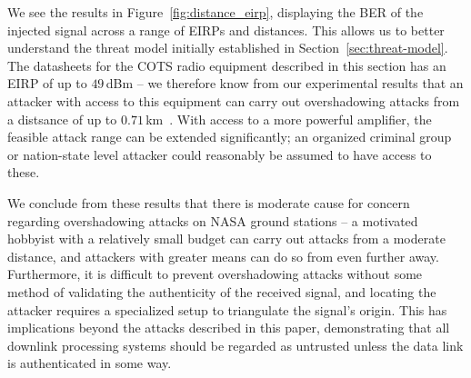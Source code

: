 We see the results in Figure~\ref{fig:distance_eirp}, displaying the BER of the injected signal across a range of EIRPs and distances.
This allows us to better understand the threat model initially established in Section~\ref{sec:threat-model}.
The datasheets for the COTS radio equipment described in this section has an EIRP of up to $49$\,dBm -- we therefore know from our experimental results that an attacker with access to this equipment can carry out overshadowing attacks from a distsance of up to $0.71$\,km~\cite{endurosat:xbandtransmitter,endurosat:xbandantenna}.
With access to a more powerful amplifier, the feasible attack range can be extended significantly; an organized criminal group or nation-state level attacker could reasonably be assumed to have access to these.

We conclude from these results that there is moderate cause for concern regarding overshadowing attacks on NASA ground stations -- a motivated hobbyist with a relatively small budget can carry out attacks from a moderate distance, and attackers with greater means can do so from even further away.
Furthermore, it is difficult to prevent overshadowing attacks without some method of validating the authenticity of the received signal, and locating the attacker requires a specialized setup to triangulate the signal's origin.
This has implications beyond the attacks described in this paper, demonstrating that all downlink processing systems should be regarded as untrusted unless the data link is authenticated in some way.
